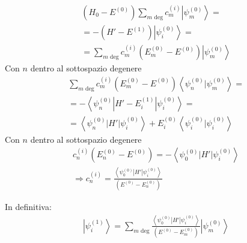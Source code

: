 
\begin{equation}\begin{split}
\left(H_0-E^{\left(0\right)}\right)\sum_{m\textrm{ deg}}{c_m^{\left(i\right)}\left |\psi _m^{\left(0\right)} \right\rangle}=\\
=-\left(H'-E^{\left(1\right)}\right)\left |\psi _i^{\left(0\right)} \right\rangle=\\
=\sum_{m\textrm{ deg}}{c_m^{\left(i\right)}\left(E_m^{\left(0\right)}-E^{\left(0\right)}\right)}\left |\psi _m^{\left(0\right)} \right\rangle
\end{split}\end{equation}
Con $n$ dentro al sottospazio degenere
\begin{equation}\begin{split}
\sum_{m\textrm{ deg}}{c_m^{\left(i\right)}\left(E_m^{\left(0\right)}-E^{\left(0\right)}\right)}\left\langle \psi _n^{\left(0\right)}|\psi _m^{\left(0\right)} \right\rangle=\\
=-\left\langle \psi _n^{\left(0\right)}|H'-E_i^{\left(1\right)}|\psi _i^{\left(0\right)} \right\rangle=\\
=\left\langle \psi _n^{\left(0\right)}|H'|\psi _i^{\left(0\right)} \right\rangle+E_i^{\left(0\right)}\left\langle \psi _i^{\left(0\right)}|\psi _i^{\left(0\right)} \right\rangle
\end{split}\end{equation}
Con $n$ dentro al sottospazio degenere
\begin{equation}\begin{split}
c_n^{\left(i\right)}\left(E_n^{\left(0\right)}-E^{\left(0\right)}\right)=-\left\langle \psi _0^{\left(0\right)}|H'|\psi _i^{\left(0\right)} \right\rangle \\
\Longrightarrow c_n^{\left(i\right)}=\frac{\left\langle \psi _0^{\left(0\right)}|H'|\psi _i^{\left(0\right)} \right\rangle}{\left(E^{\left(0\right)}-E_n^{\left(0\right)}\right)}
\end{split}\end{equation}

In definitiva:
\begin{equation}\begin{split}
\left |\psi _i^{\left(1\right)} \right\rangle=\sum_{m\textrm{ deg}}{\frac{\left\langle \psi _0^{\left(0\right)}|H'|\psi _i^{\left(0\right)} \right\rangle}{\left(E^{\left(0\right)}-E_m^{\left(0\right)}\right)}\left |\psi _m^{\left(0\right)} \right\rangle}
\end{split}\end{equation}

